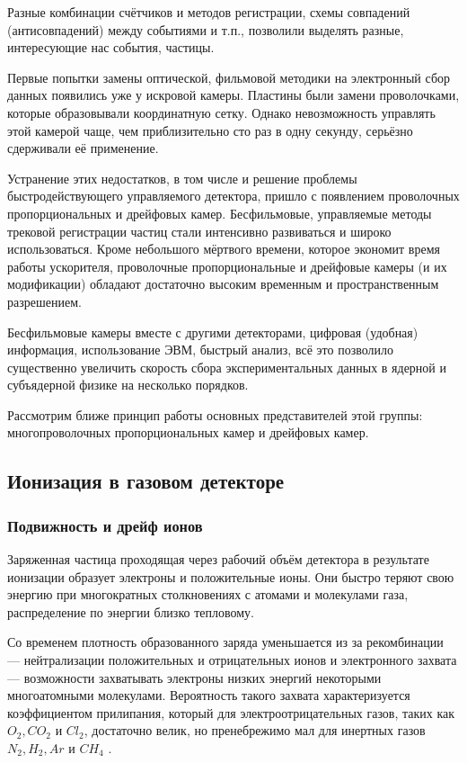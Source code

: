 Разные комбинации счётчиков и методов регистрации, схемы совпадений
(антисовпадений) между событиями и т.п., позволили выделять разные,
интересующие нас события, частицы.

Первые попытки замены оптической, фильмовой методики на электронный
сбор данных появились уже у искровой камеры. Пластины были замени
проволочками, которые образовывали координатную сетку. Однако
невозможность управлять этой камерой чаще, чем приблизительно сто раз
в одну секунду, серьёзно сдерживали её применение.

Устранение этих недостатков, в том числе и решение проблемы
быстродействующего управляемого детектора, пришло с появлением
проволочных пропорциональных и дрейфовых камер. Бесфильмовые,
управляемые методы трековой регистрации частиц стали интенсивно
развиваться и широко использоваться. Кроме небольшого мёртвого времени,
которое экономит время работы ускорителя, проволочные пропорциональные
и дрейфовые камеры (и их модификации) обладают достаточно высоким
временным и пространственным разрешением.

Бесфильмовые камеры вместе с другими детекторами, цифровая (удобная)
информация, использование ЭВМ, быстрый анализ, всё это позволило
существенно увеличить скорость сбора экспериментальных данных в ядерной и
субъядерной физике на несколько порядков.

Рассмотрим ближе принцип работы основных представителей этой группы:
многопроволочных пропорциональных камер и дрейфовых камер.

\subsection{Ионизация в газовом детекторе}
\subsubsection{Подвижность и дрейф ионов}
Заряженная частица проходящая через рабочий объём детектора в результате
ионизации образует электроны и положительные ионы. Они быстро теряют
свою энергию при многократных столкновениях с атомами и молекулами газа,
распределение по энергии близко тепловому.

Со временем плотность образованного заряда уменьшается из за
рекомбинации --- нейтрализации положительных и отрицательных ионов и
электронного захвата --- возможности захватывать электроны низких энергий
некоторыми многоатомными молекулами. Вероятность такого захвата
характеризуется коэффициентом прилипания, который для
электроотрицательных газов, таких как $O_2, CO_2$ и $Cl_2$, достаточно велик,
но пренебрежимо мал для инертных газов $N_2, H_2, Ar$ и
$CH_4$ \cite{kla:90}.

